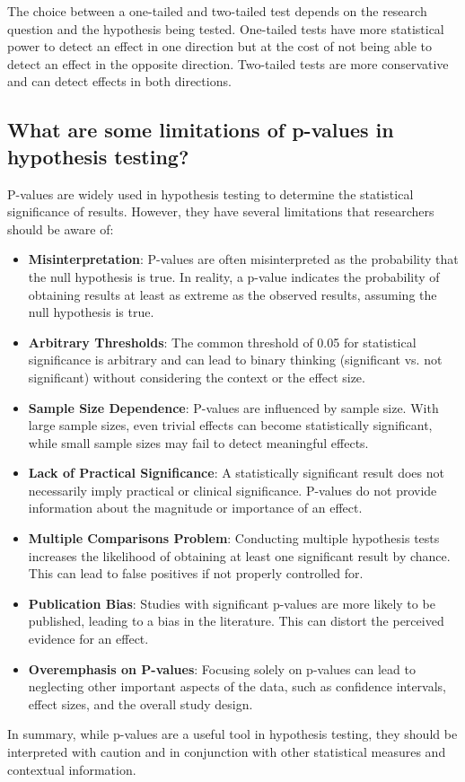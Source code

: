 \documentclass[12pt]{article}
\begin{document}
The choice between a one-tailed and two-tailed test depends on the research question and the hypothesis being tested. One-tailed tests have more statistical power to detect an effect in one direction but at the cost of not being able to detect an effect in the opposite direction. Two-tailed tests are more conservative and can detect effects in both directions.

\subsection{What are some limitations of p-values in hypothesis testing?}

P-values are widely used in hypothesis testing to determine the statistical significance of results. However, they have several limitations that researchers should be aware of:

\begin{itemize}
    \item \textbf{Misinterpretation}: P-values are often misinterpreted as the probability that the null hypothesis is true. In reality, a p-value indicates the probability of obtaining results at least as extreme as the observed results, assuming the null hypothesis is true.
    \item \textbf{Arbitrary Thresholds}: The common threshold of 0.05 for statistical significance is arbitrary and can lead to binary thinking (significant vs. not significant) without considering the context or the effect size.
    \item \textbf{Sample Size Dependence}: P-values are influenced by sample size. With large sample sizes, even trivial effects can become statistically significant, while small sample sizes may fail to detect meaningful effects.
    \item \textbf{Lack of Practical Significance}: A statistically significant result does not necessarily imply practical or clinical significance. P-values do not provide information about the magnitude or importance of an effect.
    \item \textbf{Multiple Comparisons Problem}: Conducting multiple hypothesis tests increases the likelihood of obtaining at least one significant result by chance. This can lead to false positives if not properly controlled for.
    \item \textbf{Publication Bias}: Studies with significant p-values are more likely to be published, leading to a bias in the literature. This can distort the perceived evidence for an effect.
    \item \textbf{Overemphasis on P-values}: Focusing solely on p-values can lead to neglecting other important aspects of the data, such as confidence intervals, effect sizes, and the overall study design.
\end{itemize}

In summary, while p-values are a useful tool in hypothesis testing, they should be interpreted with caution and in conjunction with other statistical measures and contextual information.
\end{document}
